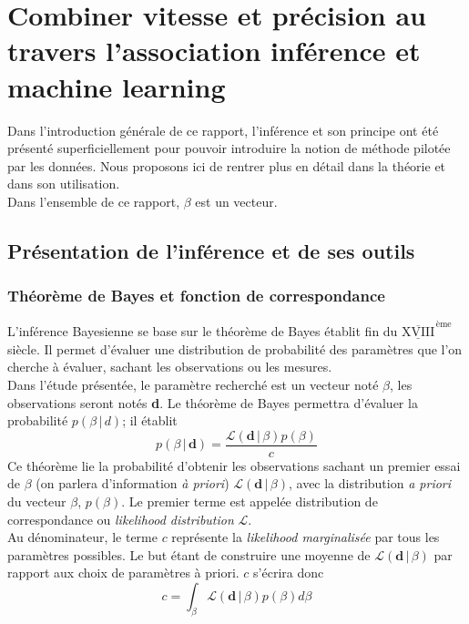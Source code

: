 \documentclass[a4paper,12pt]{article}
\newcommand{\bepar}[1]{
	\left( #1 \right)  
}
\newcommand\bk{\color{black}}
\newcommand\brick{\color{brick}}
\newcommand\navy{\color{navy}}
\newcommand\dsb{\color{dsb}}
\numberwithin{equation}{section} %
\begin{document}
\navy \section{Combiner vitesse et précision au travers l'association inférence et machine learning}
 \bk
\noindent Dans l'introduction générale de ce rapport, l'inférence et son principe ont été présenté superficiellement pour pouvoir introduire la notion de méthode pilotée par les données. Nous proposons ici de rentrer plus en détail dans la théorie et dans son utilisation. \\
Dans l'ensemble de ce rapport, $\beta$ est un vecteur.
\brick \subsection{Présentation de l'inférence et de ses outils} \bk
\dsb \subsubsection{Théorème de Bayes et fonction de correspondance} \bk
L'inférence Bayesienne se base sur le théorème de Bayes établit fin du $\overline{\underline{\text{XVIII}}}^{\, \text{ème}}$ siècle. Il permet d'évaluer une distribution de probabilité des paramètres que l'on cherche à évaluer, sachant les observations ou les mesures.\\
Dans l'étude présentée, le paramètre recherché est un vecteur noté $\beta$, les observations seront notés \textbf{d}. Le théorème de Bayes permettra d'évaluer la probabilité $p\bepar{\beta\,|\,d}$; il établit 
\begin{equation}
p\bepar{\beta\,|\,\textbf{d}} = \frac{\mathcal{L}\bepar{\textbf{d}\,|\,\beta}p\bepar{\beta}}{c} %
\end{equation}
Ce théorème lie la probabilité d'obtenir les observations sachant un premier essai de $\beta$ (on parlera d'information \textit{à priori}) $\mathcal{L}\bepar{\textbf{d}\,|\,\beta}$, avec la distribution \textit{a priori} du vecteur $\beta$, $p\bepar{\beta}$. Le premier terme est appelée distribution de correspondance ou \textit{likelihood distribution} $\mathcal{L}$.\\
Au dénominateur, le terme $c$ représente la \textit{likelihood marginalisée} par tous les paramètres possibles. Le but étant de construire une moyenne de $\mathcal{L}\bepar{\textbf{d}\,|\,\beta}$ par rapport aux choix de paramètres à priori. $c$ s'écrira donc 
\begin{equation}
c = \int_{\beta} \mathcal{L}\bepar{\textbf{d}\,|\,\beta}p\bepar{\beta} d\beta
\end{equation} \\
\end{document}
